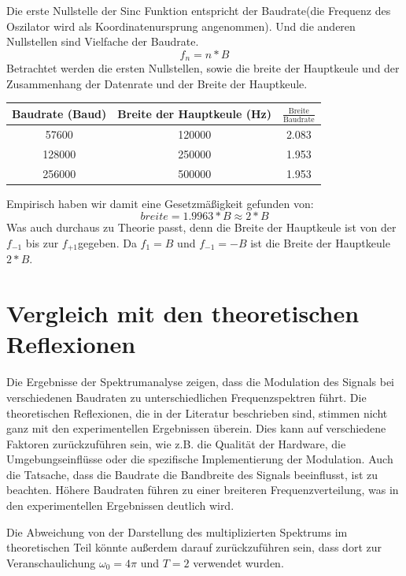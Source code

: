Die erste Nullstelle der Sinc Funktion entspricht der Baudrate(die Frequenz des Oszilator wird als Koordinatenursprung angenommen).
Und die anderen Nullstellen sind Vielfache der Baudrate.
\begin{equation}
    f_n = n * B
\end{equation}
Betrachtet werden die ersten Nullstellen, sowie die breite der Hauptkeule und der Zusammenhang der Datenrate und der Breite der Hauptkeule.

\begin{center}
\begin{tabular}{|c|c|c|}
    \hline
    Baudrate (Baud) & Breite der Hauptkeule (Hz)& $\frac{\text{Breite}}{\text{Baudrate}}$  \\
    \hline
    57600 & 120000 & 2.083 \\
    128000 & 250000 & 1.953 \\
    256000 & 500000 & 1.953 \\
    \hline
\end{tabular}
\end{center}

Empirisch haben wir damit eine Gesetzmäßigkeit gefunden von:
\begin{equation}
    breite = 1.9963 * B \approx 2 * B
\end{equation}
Was auch durchaus zu Theorie passt, denn die Breite der Hauptkeule ist von der $f_{-1}$ bis zur $f_{+1}$gegeben.
Da $f_{1} = B$ und $f_{-1} = -B$ ist die Breite der Hauptkeule $2 * B$.

\section{Vergleich mit den theoretischen Reflexionen}
Die Ergebnisse der Spektrumanalyse zeigen, dass die Modulation des Signals bei verschiedenen Baudraten zu unterschiedlichen Frequenzspektren führt. Die theoretischen Reflexionen, die in der Literatur beschrieben sind, stimmen nicht ganz mit den experimentellen Ergebnissen überein. Dies kann auf verschiedene Faktoren zurückzuführen sein, wie z.B. die Qualität der Hardware, die Umgebungseinflüsse oder die spezifische Implementierung der Modulation. Auch die Tatsache, dass die Baudrate die Bandbreite des Signals beeinflusst, ist zu beachten. Höhere Baudraten führen zu einer breiteren Frequenzverteilung, was in den experimentellen Ergebnissen deutlich wird. 

Die Abweichung von der Darstellung des multiplizierten Spektrums im theoretischen Teil könnte außerdem darauf zurückzuführen sein, dass dort zur Veranschaulichung $\omega_0 = 4\pi$ und $T = 2$ verwendet wurden.
\clearpage
